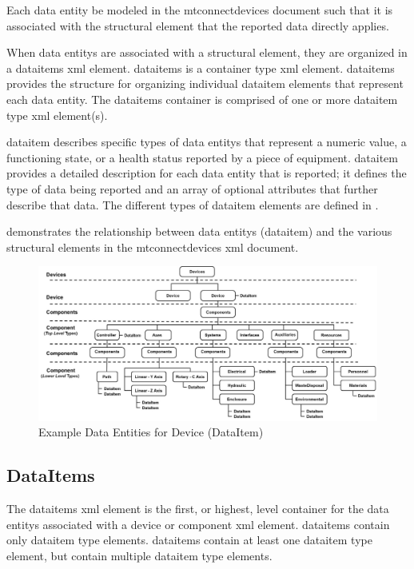 Each \gls{data entity} \should be modeled in the \gls{mtconnectdevices} document such that it is associated with the \gls{structural element} that the reported data directly applies.

When \glspl{data entity} are associated with a \gls{structural element}, they are organized in a \gls{dataitems} \gls{xml} element.   \gls{dataitems} is a container type \gls{xml} element.  \gls{dataitems} provides the structure for organizing individual \gls{dataitem} elements that represent each \gls{data entity}. The \gls{dataitems} container is comprised of one or more \gls{dataitem} type \gls{xml} element(s).

\gls{dataitem} describes specific types of \glspl{data entity} that represent a numeric value, a functioning state, or a health status reported by a piece of equipment.   \gls{dataitem} provides a detailed description for each \gls{data entity} that is reported; it defines the type of data being reported and an array of optional attributes that further describe that data.   The different types of \gls{dataitem} elements are defined in .

 demonstrates the relationship between \glspl{data entity} (\gls{dataitem}) and the various \glspl{structural element} in the \gls{mtconnectdevices} \gls{xml} document.    

\begin{figure}[ht]
  \centering
  \includegraphics[width=.75\textwidth]{figures/data-entities-example-device.png}
  \caption{Example Data Entities for Device (DataItem)}
  \label{fig:data-entities-example-device}
\end{figure}

\subsection{DataItems}

The \gls{dataitems} \gls{xml} element is the first, or highest, level container for the \glspl{data entity} associated with a \gls{device} or \gls{component} \gls{xml} element.  \gls{dataitems} \must contain only \gls{dataitem} type elements.  \gls{dataitems} \must contain at least one \gls{dataitem} type element, but \may contain multiple \gls{dataitem} type elements.


